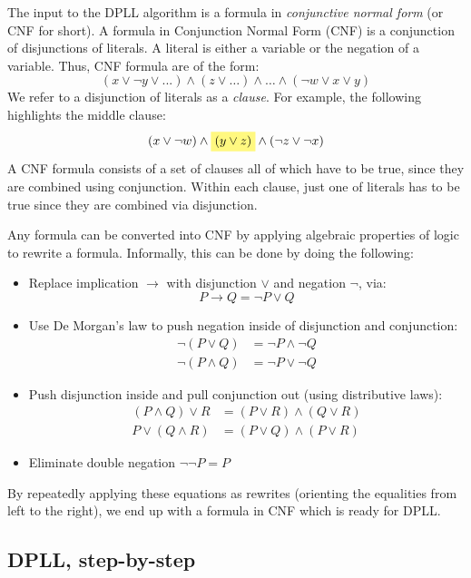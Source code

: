 \documentclass{article}
\theoremstyle{definition}
\newcommand{\highlight}[1]{%
  \colorbox{yellow!50}{$\displaystyle#1$}}
\begin{document}
The input to the DPLL algorithm is a formula in \emph{conjunctive
  normal form} (or CNF for short).  A formula in Conjunction Normal
Form (CNF) is a conjunction of disjunctions of literals. A literal is
either a variable or the negation of a variable. Thus, CNF formula are
of the form:
%
\begin{equation*}
  (\textit{x} \vee \neg \textit{y} \vee ...) \wedge
  (\textit{z} \vee \ldots) \wedge \ldots \wedge
  (\neg \textit{w} \vee \textit{x} \vee \textit{y})
\end{equation*}
%
We refer to a disjunction of literals as a \emph{clause}.
For example, the following highlights the middle clause:
%
\begin{equation}
(x \vee \neg w) \wedge \highlight{(y \vee z)} \wedge (\neg z \vee \neg x)
\end{equation}
%
A CNF formula consists of a set of clauses all of which have to be
true, since they are combined using conjunction. Within each clause,
just one of literals has to be true since they are combined via
disjunction.

Any formula can be converted into CNF by applying algebraic properties
of logic to rewrite a formula. Informally, this can be done by
doing the following:
%
\begin{itemize}[leftmargin=1em]
\item Replace implication $\rightarrow$ with disjunction $\vee$
and negation $\neg$, via: $$P \rightarrow Q = \neg P \vee Q$$
\item Use De Morgan's law to push negation inside of
disjunction and conjunction:
\begin{align*}
\neg (P \vee Q) & = \neg P \wedge \neg Q \\
\neg (P \wedge Q) & = \neg P \vee \neg Q
\end{align*}
\item Push disjunction inside and pull conjunction out (using
  distributive laws):
%
\begin{align*}
(P \wedge Q) \vee R & = (P \vee R) \wedge (Q \vee R) \\
P \vee (Q \wedge R) & = (P \vee Q) \wedge (P \vee R)
\end{align*}
\item Eliminate double negation $\neg\neg P = P$
%
\end{itemize}
%
By repeatedly applying these equations as rewrites (orienting the
equalities from left to the right), we end up with a formula
in CNF which is ready for DPLL.

\subsection{DPLL, step-by-step}
\end{document}
